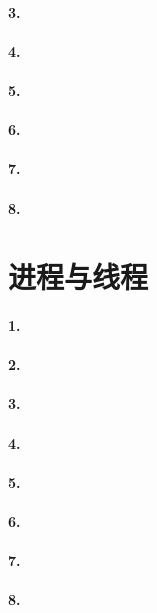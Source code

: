 \documentclass[UTF8,a4paper,8pt]{ctexart}
\begin{document}
  	 \paragraph{3.}
  	 \paragraph{4.}
  	 \paragraph{5.}
  	 \paragraph{6.}
  	 \paragraph{7.}
  	 \paragraph{8.}
 
\section*{进程与线程}
  	 \paragraph{1.} 
  	 \paragraph{2.}
  	 \paragraph{3.}
  	 \paragraph{4.}
  	 \paragraph{5.}
  	 \paragraph{6.}
  	 \paragraph{7.}
  	 \paragraph{8.}
\end{document}
